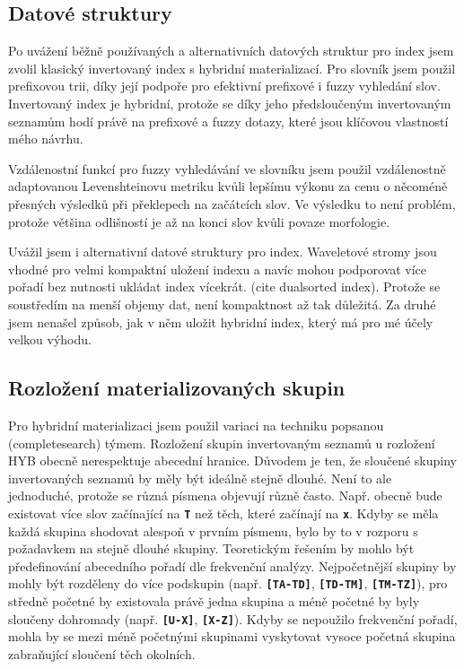 \documentclass[11pt,letterpaper,oneside,openright]{book}
\newcommand{\bftt}[1]{\texttt{\textbf{#1}}}
\begin{document}
\subsection{Datové struktury}
Po uvážení běžně používaných a alternativních datových struktur pro index jsem
zvolil klasický invertovaný index s hybridní materializací. Pro slovník jsem
použil prefixovou trii, díky její podpoře pro efektivní prefixové i fuzzy
vyhledání slov. Invertovaný index je hybridní, protože se díky jeho
předsloučeným invertovaným seznamům hodí právě na prefixové a fuzzy dotazy,
které jsou klíčovou vlastností mého návrhu.

Vzdálenostní funkcí pro fuzzy vyhledávání ve slovníku jsem použil vzdálenostně
adaptovanou Levenshteinovu metriku kvůli lepšímu výkonu za cenu o něcoméně
přesných výsledků při překlepech na začátcích slov. Ve výsledku to není
problém, protože většina odlišností je až na konci slov kvůli povaze
morfologie.

Uvážil jsem i alternativní datové struktury pro index. Waveletové stromy jsou
vhodné pro velmi kompaktní uložení indexu a navíc mohou podporovat více pořadí
bez nutnosti ukládat index vícekrát. (cite dualsorted index). Protože se
soustředím na menší objemy dat, není kompaktnost až tak důležitá. Za druhé jsem
nenašel způsob, jak v něm uložit hybridní index, který má pro mé účely velkou
výhodu.

\subsection{Rozložení materializovaných skupin}
Pro hybridní materializaci jsem použil variaci na techniku popsanou
(completesearch) týmem. Rozložení skupin invertovaným seznamů u rozložení HYB
obecně nerespektuje abecední hranice. Důvodem je ten, že sloučené skupiny
invertovaných seznamů by měly být ideálně stejně dlouhé. Není to ale
jednoduché, protože se různá písmena objevují různě často. Např. obecně bude
existovat více slov začínající na \bftt{T} než těch, které začínají na
\bftt{x}. Kdyby se měla každá skupina shodovat alespoň v prvním písmenu, bylo
by to v rozporu s požadavkem na stejně dlouhé skupiny. Teoretickým řešením by
mohlo být předefinování abecedního pořadí dle frekvenční analýzy. Nejpočetnější
skupiny by mohly být rozděleny do více podskupin (např. \bftt{[TA-TD]},
\bftt{[TD-TM]}, \bftt{[TM-TZ]}), pro středně početné by existovala právě jedna
skupina a méně početné by byly sloučeny dohromady (např. \bftt{[U-X]},
\bftt{[X-Z]}). Kdyby se nepoužilo frekvenční pořadí, mohla by se mezi méně
početnými skupinami vyskytovat vysoce početná skupina zabraňující sloučení těch
okolních.
\end{document}
